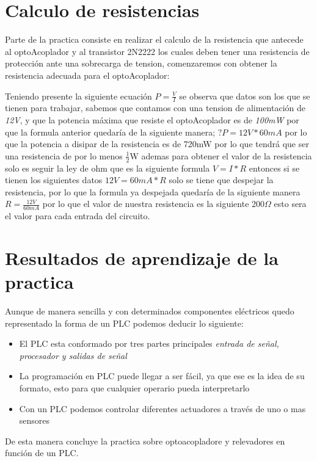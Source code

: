 \documentclass[11pt,a4paper]{article}
\begin{document}
\newpage

\section{Calculo de resistencias}

Parte de la practica consiste en realizar el calculo de la resistencia que antecede al optoAcoplador y al transistor 2N2222 los cuales deben tener una resistencia de protección ante una sobrecarga de tension, comenzaremos con obtener la resistencia adecuada para el optoAcoplador:


Teniendo presente la siguiente ecuación $P=\frac{V}{I}$ se observa que datos son los que se tienen para trabajar, sabemos que contamos con una tension de alimentación de \emph{12V}, y que la potencia máxima que resiste el optoAcoplador es de \emph{100mW}
 por que la formula anterior quedaría de la siguiente manera; $?P=12V*60mA$ por lo que la potencia a disipar de la resistencia es de 720mW por lo que tendrá que ser una resistencia de por lo menos $\frac{1}{2}$W ademas para obtener el valor de la resistencia solo es seguir la ley de ohm que es la siguiente formula $V=I*R$ entonces si se tienen los siguientes datos $12V=60mA*R$ solo se tiene que despejar la resistencia, por lo que la formula ya despejada quedaría de la siguiente manera $R=\frac{12V}{60mA}$ por lo que el valor de nuestra resistencia es la siguiente 200$\Omega$ esto sera el valor para cada entrada del circuito.
 
\section{Resultados de aprendizaje de la practica}

Aunque de manera sencilla y con determinados componentes eléctricos quedo representado la forma de un PLC podemos deducir lo siguiente:

\begin{itemize}
\item El PLC esta conformado por tres partes principales \emph{entrada de señal, procesador y salidas de señal}
\item La programación en PLC puede llegar a ser fácil, ya que ese es la idea de su formato, esto para que cualquier operario pueda interpretarlo
\item Con un PLC podemos controlar diferentes actuadores a través de uno o mas sensores

\end{itemize}

De esta manera concluye la practica sobre optoacopladore y relevadores en función de un PLC.
\end{document}
